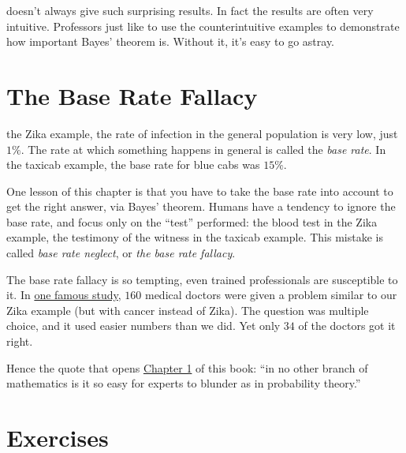 \documentclass[justified]{tufte-book}
\theoremstyle{definition}
\theoremstyle{definition}
\theoremstyle{definition}
\theoremstyle{remark}
\begin{document}
 doesn't always give such surprising results.
In fact the results are often very intuitive. Professors just like to
use the counterintuitive examples to demonstrate how important Bayes'
theorem is. Without it, it's easy to go astray.

\hypertarget{baserate}{%
\section{The Base Rate Fallacy}\label{baserate}}

 the Zika example, the rate of infection in the general
population is very low, just \(1\%\). The rate at which something
happens in general is called the \emph{base rate}. In the taxicab
example, the base rate for blue cabs was \(15\%\).

One lesson of this chapter is that you have to take the base rate into
account to get the right answer, via Bayes' theorem. Humans have a
tendency to ignore the base rate, and focus only on the ``test''
performed: the blood test in the Zika example, the testimony of the
witness in the taxicab example. This mistake is called \emph{base rate
neglect}, or \emph{the base rate fallacy}.

The base rate fallacy is so tempting, even trained professionals are
susceptible to it. In
\href{https://www.stat.berkeley.edu/~aldous/157/Papers/health_stats.pdf}{one
famous study}, \(160\) medical doctors were given a problem similar to
our Zika example (but with cancer instead of Zika). The question was
multiple choice, and it used easier numbers than we did. Yet only \(34\)
of the doctors got it right.

Hence the quote that opens
\protect\hyperlink{the-monty-hall-problem}{Chapter 1} of this book: ``in
no other branch of mathematics is it so easy for experts to blunder as
in probability theory.''

\hypertarget{exercises-6}{%
\section*{Exercises}\label{exercises-6}}
\end{document}
